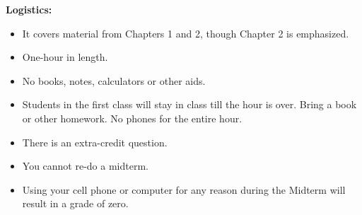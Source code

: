 \documentclass[12pt]{article}
\begin{document}
\textbf{Logistics:} 
\begin{itemize}
	\item It covers material from Chapters 1 and 2, though Chapter 2 is emphasized. 
	\item One-hour in length.
	\item No books, notes, calculators or other aids.
	\item Students in the first class will stay in class till the hour is over. Bring a book or other homework. No phones for the entire hour.
	\item There is an extra-credit question.
	\item You cannot re-do a midterm.
	\item Using your cell phone or computer for any reason during the Midterm will result in a grade of zero.
	\end{itemize}
	
\vspace{.25in}
\end{document}
